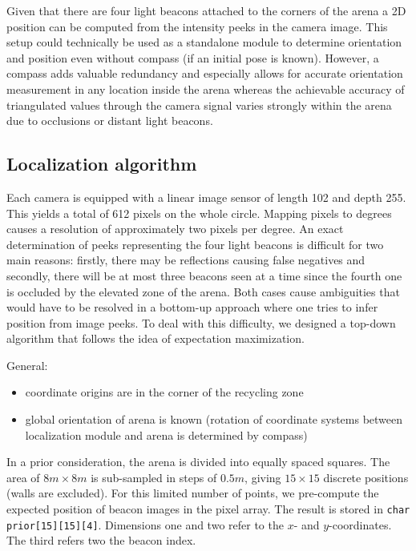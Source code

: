 Given that there are four light beacons attached to the corners of the arena a 
2D position can be computed from the intensity peeks in the camera image.
This setup could technically be used as a standalone module to determine orientation
and position even without compass (if an initial pose is known). However, a compass 
adds valuable redundancy and especially allows for accurate orientation measurement
in any location inside the arena whereas the achievable accuracy of triangulated 
values through the camera signal varies strongly within the arena due to occlusions
or distant light beacons.

\subsection{Localization algorithm}
Each camera is equipped with a linear image sensor of length 102 and depth 255. This
yields a total of 612 pixels on the whole circle. Mapping pixels to degrees causes a 
resolution of approximately two pixels per degree. An exact determination of peeks 
representing the four light beacons is difficult for two main reasons: firstly, there may be
reflections causing false negatives and secondly, there will be at most three beacons
seen at a time since the fourth one is occluded by the elevated zone of the arena.
Both cases cause ambiguities that would have to be resolved in a bottom-up approach
where one tries to infer position from image peeks. To deal with this difficulty,
we designed a top-down algorithm that follows the idea of expectation maximization.

General:
\begin{itemize}
    \item coordinate origins are in the corner of the recycling zone
    \item global orientation of arena is known (rotation of coordinate systems
        between localization module and arena is determined by compass)
\end{itemize}

In a prior consideration, the arena is divided into equally spaced squares. The area
of $8m \times 8m$ is sub-sampled in steps of $0.5m$, giving $15 \times 15$ discrete 
positions (walls are excluded). For this limited number of points, we pre-compute 
the expected position of beacon images in the pixel array. The result is stored in
\texttt{char prior[15][15][4]}. Dimensions one and two refer to the $x$- and $y$-coordinates.
The third refers two the beacon index.

